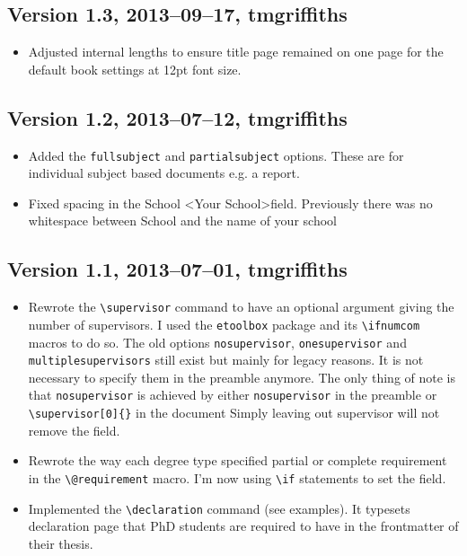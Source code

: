 \documentclass[12pt,oneside]{article}
\newcommand{\option}[1]{\texttt{\color{Green}#1}} %
\newcommand{\command}[1]{\texttt{\color{Red}#1}} %
\newcommand{\comoptions}[1]{\texttt{\color{Blue}#1}} %
\begin{document}
\subsection*{Version 1.3, 2013–09–17, tmgriffiths}
\begin{itemize}
    \item Adjusted internal lengths to ensure title page remained on one page for the default book settings at 12pt font size.
\end{itemize}

\subsection*{Version 1.2, 2013–07–12, tmgriffiths}
\begin{itemize}
    \item Added the \option{fullsubject} and \option{partialsubject} options. These are for individual subject based documents e.g. a report.
    \item Fixed spacing in the School \textless{}Your School\textgreater field. Previously there was no whitespace between School and the name of your school
\end{itemize}    
\subsection*{Version 1.1, 2013–07–01, tmgriffiths}
\begin{itemize}
    \item Rewrote the \command{\textbackslash{}supervisor} command to have an optional argument giving the number of supervisors. I used the \texttt{etoolbox} package and its \texttt{\textbackslash{}ifnumcom} macros to do so. The old options \option{nosupervisor}, \option{onesupervisor} and \option{multiplesupervisors} still exist but mainly for legacy reasons. It is not necessary to specify them in the preamble anymore. The only thing of note is that \option{nosupervisor} is achieved by either \option{nosupervisor} in the preamble or \command{\textbackslash{}supervisor}\comoptions{\texttt{[0]\{\}}} in the document Simply leaving out supervisor will not remove the field.
    \item Rewrote the way each degree type specified partial or complete requirement in the \command{\textbackslash{}@requirement} macro. I'm now using \texttt{\textbackslash{}if} statements to set the field.
    \item Implemented the \command{\textbackslash{}declaration} command (see examples). It typesets declaration page that PhD students are required to have in the frontmatter of their thesis.
\end{itemize}
\end{document}
